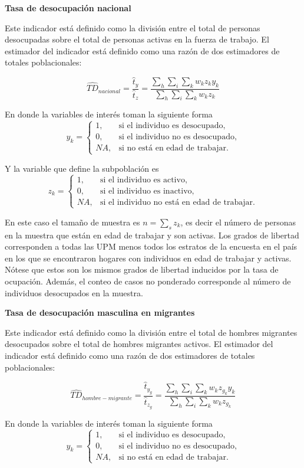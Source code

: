 \documentclass[
  10pt,
  spanish,
]{book}
\begin{document}
\textbf{Tasa de desocupación nacional}

Este indicador está definido como la división entre el total de personas desocupadas sobre el total de personas activas en la fuerza de trabajo. El estimador del indicador está definido como una razón de dos estimadores de totales poblacionales:

\[
\widehat{TD}_{nacional} =  \frac{\hat t_y}{\hat t_z} =\frac{\sum_h\sum_i\sum_k w_kz_{k}y_{k}}{\sum_h\sum_i\sum_k w_kz_{k}}
\]

En donde la variables de interés toman la siguiente forma
\[
y_{k}=
\begin{cases}
1, &\text{si el individuo es desocupado,}\\
0, &\text{si el individuo no es desocupado,}\\
NA, &\text{si no está en edad de trabajar.}
\end{cases}
\]

Y la variable que define la subpoblación es
\[
z_{k}=
\begin{cases}
1, &\text{si el individuo es activo,}\\
0, &\text{si el individuo es inactivo,}\\
NA, &\text{si el individuo no está en edad de trabajar.}
\end{cases}
\]

En este caso el tamaño de muestra es \(n = \sum_s z_{k}\), es decir el número de personas en la muestra que están en edad de trabajar y son activas. Los grados de libertad corresponden a todas las UPM menos todos los estratos de la encuesta en el país en los que se encontraron hogares con individuos en edad de trabajar y activas. Nótese que estos son los mismos grados de libertad inducidos por la tasa de ocupación. Además, el conteo de casos no ponderado corresponde al número de individuos desocupados en la muestra.

\textbf{Tasa de desocupación masculina en migrantes}

Este indicador está definido como la división entre el total de hombres migrantes desocupados sobre el total de hombres migrantes activos. El estimador del indicador está definido como una razón de dos estimadores de totales poblacionales:

\[
\widehat{TD}_{hombre-migrante} =  \frac{\hat t_{y_g}}{\hat t_{z_g}} =\frac{\sum_h\sum_i\sum_k w_kz_{g_k}y_{k}}{\sum_h\sum_i\sum_k w_kz_{g_k}}
\]

En donde la variables de interés toman la siguiente forma
\[
y_{k}=
\begin{cases}
1, &\text{si el individuo es desocupado,}\\
0, &\text{si el individuo no es desocupado,}\\
NA, &\text{si no está en edad de trabajar.}
\end{cases}
\]
\end{document}
